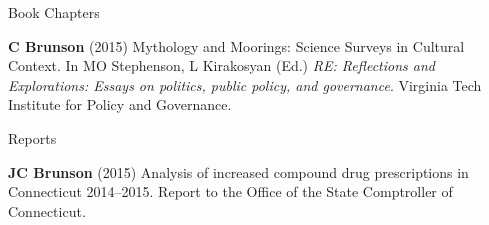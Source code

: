 \documentclass[10pt,a4paper]{article}
\begin{document}
%
\vspace{.25cm}
{\sc Book Chapters}
\begin{enumerate}[label={[\arabic*]},labelindent=1cm,nolistsep]
\item
{\bfseries C Brunson} (2015) Mythology and Moorings: Science Surveys in Cultural Context. In MO Stephenson, L Kirakosyan (Ed.) {\itshape RE: Reflections and Explorations: Essays on politics, public policy, and governance}. Virginia Tech Institute for Policy and Governance.
\setcounter{paper}{\value{enumi}}
\end{enumerate}
%
\vspace{.25cm}
{\sc Reports}
\begin{enumerate}[label={[\arabic*]},labelindent=1cm,nolistsep]
\item
{\bfseries JC Brunson} (2015) Analysis of increased compound drug prescriptions in Connecticut 2014--2015. Report to the Office of the State Comptroller of Connecticut.
\setcounter{paper}{\value{enumi}}
\end{enumerate}

\end{document}
